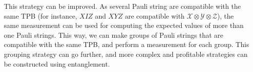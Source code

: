 \documentclass[11pt, twocolumn]{article}
\begin{document}
This strategy can be improved. As several Pauli string are compatible with the same TPB (for instance, $XIZ$ and $XYZ$ are compatible with $\mathcal{X}\otimes\mathcal{Y}\otimes\mathcal{Z}$), the same measurement can be used for computing the expected values of more than one Pauli strings. This way, we can make groups of Pauli strings that are compatible with the same TPB, and perform a measurement for each group.
This grouping strategy can go further, and more complex and profitable strategies can be constructed using entanglement. 

\pagebreak
\begin{table}[]
\caption{ Number of groups for some molecules using different grouping strategies. HEEM groups have been obtained respecting the connectivity of the quantum device \emph{ibmq\_paris}. The EM and HEEM are results of 200 random sorting of the Pauli strings. LiH* and BeH$_2$* has qubit reduction.}
\label{table2}
\end{table}
\end{document}
